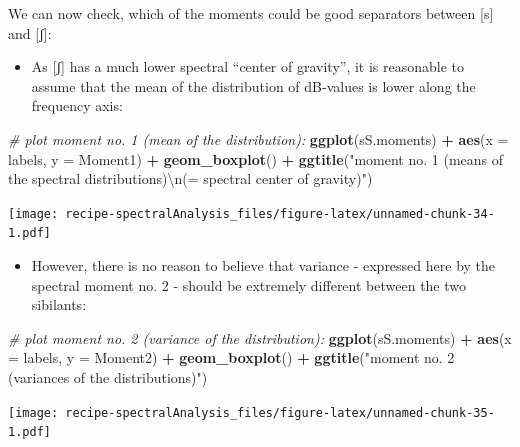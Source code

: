 \documentclass[]{book}
\newenvironment{Shaded}{\begin{snugshade}}{\end{snugshade}}
\newcommand{\CharTok}[1]{\textcolor[rgb]{0.31,0.60,0.02}{#1}}
\newcommand{\CommentTok}[1]{\textcolor[rgb]{0.56,0.35,0.01}{\textit{#1}}}
\newcommand{\DataTypeTok}[1]{\textcolor[rgb]{0.13,0.29,0.53}{#1}}
\newcommand{\KeywordTok}[1]{\textcolor[rgb]{0.13,0.29,0.53}{\textbf{#1}}}
\newcommand{\NormalTok}[1]{#1}
\newcommand{\OperatorTok}[1]{\textcolor[rgb]{0.81,0.36,0.00}{\textbf{#1}}}
\newcommand{\StringTok}[1]{\textcolor[rgb]{0.31,0.60,0.02}{#1}}
\providecommand{\tightlist}{%
  \setlength{\itemsep}{0pt}\setlength{\parskip}{0pt}}
\begin{document}
We can now check, which of the moments could be good separators between {[}s{]} and {[}ʃ{]}:

\begin{itemize}
\tightlist
\item
  As {[}ʃ{]} has a much lower spectral ``center of gravity'', it is reasonable to assume that the mean of the distribution of dB-values is lower along the frequency axis:
\end{itemize}

\begin{Shaded}
\begin{Highlighting}[]
\CommentTok{# plot moment no. 1 (mean of the distribution):}
\KeywordTok{ggplot}\NormalTok{(sS.moments) }\OperatorTok{+}
\StringTok{  }\KeywordTok{aes}\NormalTok{(}\DataTypeTok{x =}\NormalTok{ labels, }\DataTypeTok{y =}\NormalTok{ Moment1) }\OperatorTok{+}
\StringTok{  }\KeywordTok{geom_boxplot}\NormalTok{() }\OperatorTok{+}
\StringTok{  }\KeywordTok{ggtitle}\NormalTok{(}\StringTok{"moment no. 1 (means of the spectral distributions)}\CharTok{\textbackslash{}n}\StringTok{(= spectral center of gravity)"}\NormalTok{)}
\end{Highlighting}
\end{Shaded}

\texttt{[image: recipe-spectralAnalysis\_files/figure-latex/unnamed-chunk-34-1.pdf]}

\begin{itemize}
\tightlist
\item
  However, there is no reason to believe that variance - expressed here by the spectral moment no. 2 - should be extremely different between the two sibilants:
\end{itemize}

\begin{Shaded}
\begin{Highlighting}[]
\CommentTok{# plot moment no. 2 (variance of the distribution):}
\KeywordTok{ggplot}\NormalTok{(sS.moments) }\OperatorTok{+}
\StringTok{  }\KeywordTok{aes}\NormalTok{(}\DataTypeTok{x =}\NormalTok{ labels, }\DataTypeTok{y =}\NormalTok{ Moment2) }\OperatorTok{+}
\StringTok{  }\KeywordTok{geom_boxplot}\NormalTok{() }\OperatorTok{+}
\StringTok{  }\KeywordTok{ggtitle}\NormalTok{(}\StringTok{"moment no. 2 (variances of the distributions)"}\NormalTok{)}
\end{Highlighting}
\end{Shaded}

\texttt{[image: recipe-spectralAnalysis\_files/figure-latex/unnamed-chunk-35-1.pdf]}
\end{document}
